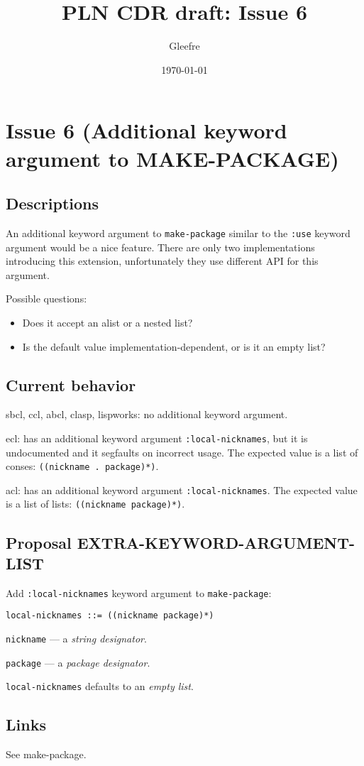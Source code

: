 \documentclass[11pt]{article}
\author{Gleefre}
\date{\today}
\title{PLN CDR draft: Issue 6}
\begin{document}
\maketitle

\section{Issue 6 (Additional keyword argument to MAKE-PACKAGE)}
\label{sec:org47f1068}
\subsection{Descriptions}
\label{sec:org7de447e}
An additional keyword argument to \texttt{make-package} similar to the \texttt{:use} keyword
argument would be a nice feature. There are only two implementations introducing
this extension, unfortunately they use different API for this argument.

Possible questions:
\begin{itemize}
\item Does it accept an alist or a nested list?
\item Is the default value implementation-dependent, or is it an empty list?
\end{itemize}
\subsection{Current behavior}
\label{sec:orgf62475e}
sbcl, ccl, abcl, clasp, lispworks: no additional keyword argument.

ecl: has an additional keyword argument \texttt{:local-nicknames}, but it is undocumented
and it segfaults on incorrect usage. The expected value is a list of conses:
\texttt{((nickname . package)*)}.

acl: has an additional keyword argument \texttt{:local-nicknames}. The expected value is
a list of lists: \texttt{((nickname package)*)}.
\subsection{Proposal EXTRA-KEYWORD-ARGUMENT-LIST}
\label{sec:orgb2c267c}
Add \texttt{:local-nicknames} keyword argument to \texttt{make-package}:
\begin{verbatim}
local-nicknames ::= ((nickname package)*)
\end{verbatim}


\texttt{nickname} --- a \emph{string designator}.

\texttt{package} --- a \emph{package designator}.

\texttt{local-nicknames} defaults to an \emph{empty list}.
\subsection{Links}
\label{sec:orgca4dc98}
See make-package.
\end{document}
